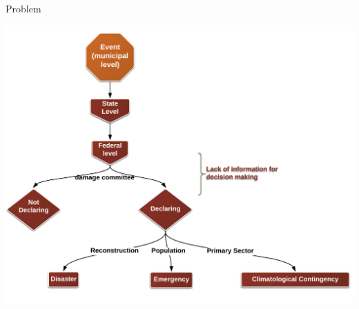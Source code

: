 \documentclass[ignorenonframetext,]{beamer}
\begin{document}
\begin{frame}{Problem}

\includegraphics{img/proceso.png}

\end{frame}
\end{document}
